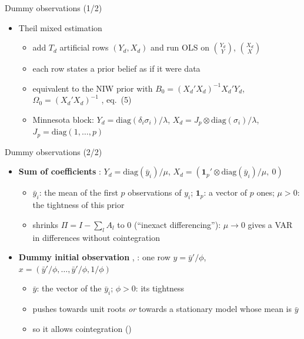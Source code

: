 \begin{frame}{Dummy observations (1/2)}
\itemsize{\small}
\begin{itemize}
    \item Theil mixed estimation
    \begin{itemize}
        \item add $T_d$ artificial rows $(Y_d, X_d)$ and run OLS on $\binom{Y_d}{Y}$, $\binom{X_d}{X}$
        \item each row states a prior belief as if it were data
        \item equivalent to the NIW prior with $B_0 = (X_d'X_d)^{-1}X_d'Y_d$, $\Omega_0 = (X_d'X_d)^{-1}$ , eq.~(5)
        \item Minnesota block: $Y_d = \mathrm{diag}(\delta_i\sigma_i)/\lambda$, $X_d = J_p\otimes\mathrm{diag}(\sigma_i)/\lambda$, $J_p = \mathrm{diag}(1, \dots, p)$
    \end{itemize}
\end{itemize}
\end{frame}

\begin{frame}{Dummy observations (2/2)}
\itemsize{\small}
\begin{itemize}
    \item \textbf{Sum of coefficients} : $Y_d = \mathrm{diag}(\bar y_i)/\mu$, $X_d = (\mathbf{1}_p'\otimes\mathrm{diag}(\bar y_i)/\mu,\ 0)$
    \begin{itemize}
        \item $\bar y_i$: the mean of the first $p$ observations of $y_i$; $\mathbf{1}_p$: a vector of $p$ ones; $\mu > 0$: the tightness of this prior
        \item shrinks $\Pi = I - \sum_l A_l$ to 0 (``inexact differencing''): $\mu \to 0$ gives a VAR in differences without cointegration
    \end{itemize}
    \item \textbf{Dummy initial observation} , : one row $y = \bar y'/\phi$, $x = (\bar y'/\phi, \dots, \bar y'/\phi, 1/\phi)$
    \begin{itemize}
        \item $\bar y$: the vector of the $\bar y_i$; $\phi > 0$: its tightness
        \item pushes towards unit roots \emph{or} towards a stationary model whose mean is $\bar y$
        \item so it allows cointegration ()
    \end{itemize}
\end{itemize}
\end{frame}


